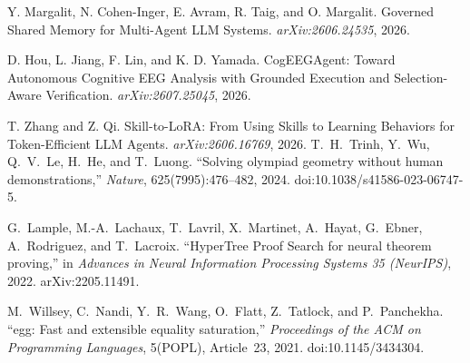 Y. Margalit, N. Cohen-Inger, E. Avram, R. Taig, and O. Margalit. Governed Shared Memory for Multi-Agent LLM Systems. \emph{arXiv:2606.24535}, 2026.

D. Hou, L. Jiang, F. Lin, and K. D. Yamada. CogEEGAgent: Toward Autonomous Cognitive EEG Analysis with Grounded Execution and Selection-Aware Verification. \emph{arXiv:2607.25045}, 2026.

T. Zhang and Z. Qi. Skill-to-LoRA: From Using Skills to Learning Behaviors for Token-Efficient LLM Agents. \emph{arXiv:2606.16769}, 2026.
T.~H.~Trinh, Y.~Wu, Q.~V.~Le, H.~He, and T.~Luong.
``Solving olympiad geometry without human demonstrations,''
\emph{Nature}, 625(7995):476--482, 2024. doi:10.1038/s41586-023-06747-5.

G.~Lample, M.-A.~Lachaux, T.~Lavril, X.~Martinet, A.~Hayat, G.~Ebner,
A.~Rodriguez, and T.~Lacroix.
``HyperTree Proof Search for neural theorem proving,''
in \emph{Advances in Neural Information Processing Systems 35 (NeurIPS)}, 2022.
arXiv:2205.11491.

M.~Willsey, C.~Nandi, Y.~R.~Wang, O.~Flatt, Z.~Tatlock, and P.~Panchekha.
``egg: Fast and extensible equality saturation,''
\emph{Proceedings of the ACM on Programming Languages}, 5(POPL), Article~23,
2021. doi:10.1145/3434304.
